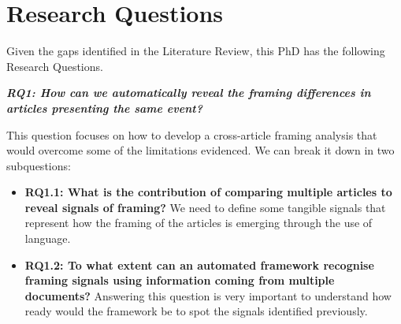 \chapter{Research Questions}
\label{chap:research_questions}


Given the gaps identified in the Literature Review, this PhD has the following Research Questions.

\vspace{12px}

\textit{\textbf{RQ1: How can we automatically reveal the framing differences in articles presenting the same event?}}

\vspace{12px}

This question focuses on how to develop a cross-article framing analysis that would overcome some of the limitations evidenced.
We can break it down in two subquestions:

\begin{itemize}
    
    \item \textbf{RQ1.1: What is the contribution of comparing multiple articles to reveal signals of framing?} We need to define some tangible signals that represent how the framing of the articles is emerging through the use of language. %
    
    
    \item \textbf{RQ1.2: To what extent can an automated framework recognise framing signals using information coming from multiple documents?}
    Answering this question is very important to understand how ready would the framework be to spot the signals identified previously. %
    
\end{itemize}


